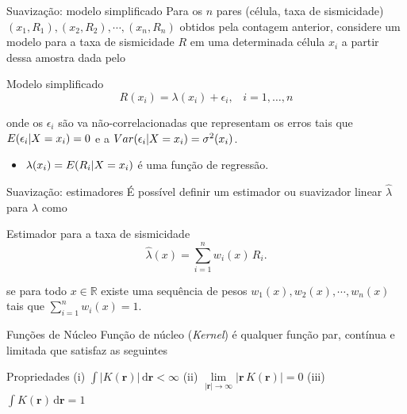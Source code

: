 \documentclass[ucs,8pt]{beamer}
\begin{document}
\begin{frame}{Suavização: modelo simplificado}
Para os $n$ pares (célula, taxa de sismicidade) $(x_1, R_1), (x_2, R_2), \cdots, (x_n, R_n)$
obtidos pela contagem anterior, considere um modelo para a taxa de sismicidade $R$ 
em uma determinada célula $x_i$ a partir dessa amostra dada pelo
	\begin{block}{Modelo simplificado}
		\begin{equation}
			\ensuremath{
				R(x_i) = \lambda(x_i) + \epsilon_i,\;\;\; i=1,\dots,n
			}
		\label{eq:rate_model}
		\end{equation}
	\end{block}
	onde os $\epsilon_i$ são \gls{va} não-correlacionadas que
	representam os erros tais que $E(\epsilon_i \arrowvert X = x_i) = 0$ 
	e a $Var(\epsilon_i \arrowvert X = x_i) = \sigma^2(x_i)$. 
	
	\begin{itemize}
	  \item $\lambda(x_i) = E(R_i \arrowvert X = x_i)$ é uma função de regressão.
	\end{itemize}
\end{frame}



\begin{frame}{Suavização: estimadores}
É possível definir um estimador ou suavizador linear $\hat{\lambda}$ para $\lambda$
como
	\begin{block}{Estimador para a taxa de sismicidade}
		\begin{equation}
			\ensuremath{
				\hat{\lambda}(x) = \sum_{i=1}^{n}w_i(x)\,R_i.
			}
		\label{eq:rate_estim}
		\end{equation}
	\end{block}
se para todo $x \in \mathbb{R}$ existe uma sequência de pesos $w_1(x),
w_2(x),\cdots,w_n(x)$ tais que $\sum_{i=1}^{n}w_i(x) = 1$.
\end{frame}



\begin{frame}{Funções de Núcleo}
Função de núcleo (\emph{Kernel}) é qualquer função par, contínua e limitada que satisfaz as seguintes
	\begin{block}{Propriedades}
		\centering
		(i) $\int \lvert K(\boldsymbol{r})\rvert \,\mathrm{d}\boldsymbol{r} < \infty $
		\;\;\;\;\;(ii) $\underset{ \lvert\boldsymbol{r} \rvert \to \infty }{\lim} 
						\lvert \boldsymbol{r} \, K(\boldsymbol{r})\rvert =0$ 
		\;\;\;\;\;(iii) $\int \! K(\boldsymbol{r})	\,\mathrm{d}\boldsymbol{r} = 1 $
	\end{block}
\end{frame}
\end{document}
